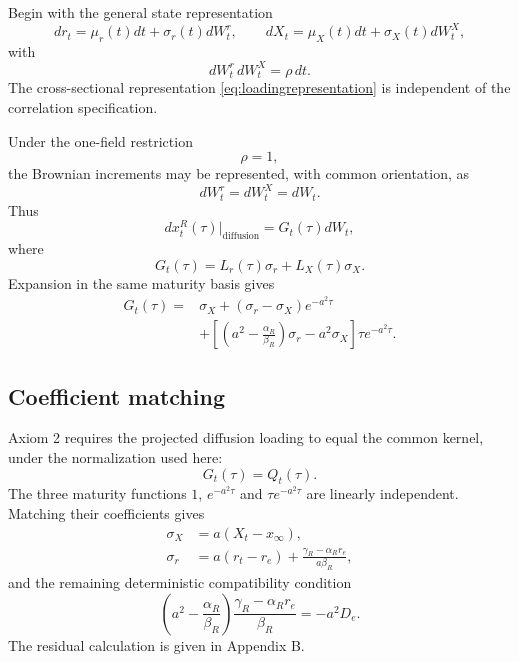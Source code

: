 \documentclass[11pt]{article}
\numberwithin{equation}{section}
\begin{document}
Begin with the general state representation
\begin{equation}
 dr_t=\mu_r(t)dt+\sigma_r(t)dW_t^r,
 \qquad
 dX_t=\mu_X(t)dt+\sigma_X(t)dW_t^X,
\end{equation}
with
\begin{equation}
 dW_t^r\,dW_t^X=\rho\,dt.
\end{equation}
The cross-sectional representation \eqref{eq:loadingrepresentation} is independent of the correlation specification.

Under the one-field restriction
\begin{equation}
 \rho=1,
\end{equation}
the Brownian increments may be represented, with common orientation, as
\begin{equation}
 dW_t^r=dW_t^X=dW_t.
\end{equation}
Thus
\begin{equation}
 dx_t^R(\tau)\big|_{\mathrm{diffusion}}
 =G_t(\tau)dW_t,
\end{equation}
where
\begin{equation}
 {
 G_t(\tau)=L_r(\tau)\sigma_r+L_X(\tau)\sigma_X.
 }
 \label{eq:Gdefinition}
\end{equation}
Expansion in the same maturity basis gives
\begin{align}
 G_t(\tau)
 ={}&\sigma_X
 +(\sigma_r-\sigma_X)e^{-a^2\tau}
 \nonumber\\
 &+\left[
 \left(a^2-\frac{\alpha_R}{\beta_R}\right)\sigma_r
 -a^2\sigma_X
 \right]\tau e^{-a^2\tau}.
 \label{eq:Gexpanded}
\end{align}

\subsection{Coefficient matching}

Axiom 2 requires the projected diffusion loading to equal the common kernel, under the normalization used here:
\begin{equation}
 \boxed{G_t(\tau)=Q_t(\tau).}
 \label{eq:GequalsQ}
\end{equation}
The three maturity functions $1$, $e^{-a^2\tau}$ and $\tau e^{-a^2\tau}$ are linearly independent. Matching their coefficients gives
\begin{align}
 \sigma_X&=a(X_t-x_\infty),
 \label{eq:sigmaX}\\
 \sigma_r&=a(r_t-r_e)+\frac{\gamma_R-\alpha_Rr_e}{a\beta_R},
 \label{eq:sigmar}
\end{align}
and the remaining deterministic compatibility condition
\begin{equation}
 \left(a^2-\frac{\alpha_R}{\beta_R}\right)
 \frac{\gamma_R-\alpha_Rr_e}{\beta_R}
 =-a^2D_e.
 \label{eq:compatibilitygeneral}
\end{equation}
The residual calculation is given in Appendix B.
\end{document}
